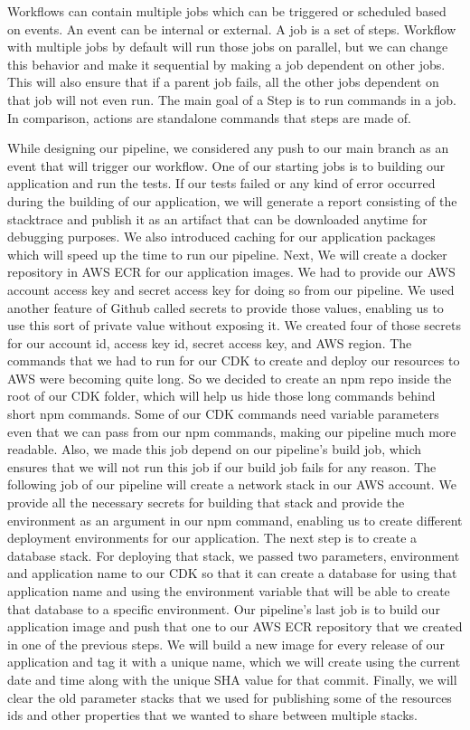 Workflows can contain multiple jobs which can be triggered or scheduled based on events. An event can be internal or external. A job is a set of steps. Workflow with multiple jobs by default will run those jobs on parallel, but we can change this behavior and make it sequential by making a job dependent on other jobs. This will also ensure that if a parent job fails, all the other jobs dependent on that job will not even run. The main goal of a Step is to run commands in a job. In comparison, actions are standalone commands that steps are made of. 

While designing our pipeline, we considered any push to our main branch as an event that will trigger our workflow. One of our starting jobs is to building our application and run the tests. If our tests failed or any kind of error occurred during the building of our application, we will generate a report consisting of the stacktrace and publish it as an artifact that can be downloaded anytime for debugging purposes. We also introduced caching for our application packages which will speed up the time to run our pipeline. Next, We will create a docker repository in AWS ECR for our application images. We had to provide our AWS account access key and secret access key for doing so from our pipeline. We used another feature of Github called secrets to provide those values, enabling us to use this sort of private value without exposing it. We created four of those secrets for our account id, access key id, secret access key, and AWS region. The commands that we had to run for our CDK to create and deploy our resources to AWS were becoming quite long. So we decided to create an npm repo inside the root of our CDK folder, which will help us hide those long commands behind short npm commands. Some of our CDK commands need variable parameters even that we can pass from our npm commands, making our pipeline much more readable. Also, we made this job depend on our pipeline's build job, which ensures that we will not run this job if our build job fails for any reason. The following job of our pipeline will create a network stack in our AWS account. We provide all the necessary secrets for building that stack and provide the environment as an argument in our npm command, enabling us to create different deployment environments for our application. The next step is to create a database stack. For deploying that stack, we passed two parameters, environment and application name to our CDK so that it can create a database for using that application name and using the environment variable that will be able to create that database to a specific environment. Our pipeline's last job is to build our application image and push that one to our AWS ECR repository that we created in one of the previous steps. We will build a new image for every release of our application and tag it with a unique name, which we will create using the current date and time along with the unique SHA value for that commit. Finally, we will clear the old parameter stacks that we used for publishing some of the resources ids and other properties that we wanted to share between multiple stacks.


